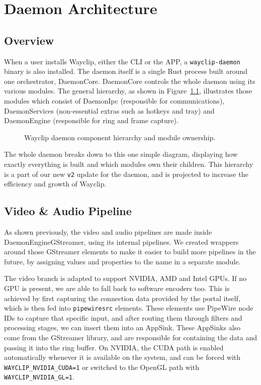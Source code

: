 \chapter{Daemon Architecture} \label{chapt:daemon}

\section{Overview}

When a user installs Wayclip, either the CLI or the APP, a \lstinline|wayclip-daemon| binary is also installed.
The daemon itself is a single Rust process built around one orchestrator, DaemonCore. DaemonCore controls the whole daemon using its various modules.
The general hierarchy, as shown in Figure~\ref{fig:ownership}, illustrates those modules which consist of DaemonIpc (responsible for communications), DaemonServices (non-essential extras such as hotkeys and tray) and DaemonEngine (responsible for ring and frame capture).

\begin{figure}[htbp]
	\centering
	
	\caption{Wayclip daemon component hierarchy and module ownership.}
	\label{fig:ownership}
\end{figure}

The whole daemon breaks down to this one simple diagram, displaying how exactly everything is built and which modules own their children. This hierarchy is a part of our new \lstinline|v2| update for the daemon, and is projected to increase the efficiency and growth of Wayclip.


\section{Video \& Audio Pipeline}

As shown previously, the video and audio pipelines are made inside DaemonEngineGStreamer, using its internal pipelines. We created wrappers around those GStreamer elements to make it easier to build more pipelines in the future, by assigning values and properties to the name in a separate module.

The video branch is adapted to support NVIDIA, AMD and Intel GPUs. If no GPU is present, we are able to fall back to software encoders too. This is achieved by first capturing the connection data provided by the portal itself, which is then fed into \lstinline|pipewiresrc| elements.
These elements use PipeWire node IDs to capture that specific input, and after routing them through filters and processing stages, we can insert them into an AppSink. These AppSinks also come from the GStreamer library, and are responsible for containing the data and passing it into the ring buffer. On NVIDIA, the CUDA path is enabled automatically whenever it is available on the system, and can be forced with \lstinline|WAYCLIP_NVIDIA_CUDA=1| or switched to the OpenGL path with \lstinline|WAYCLIP_NVIDIA_GL=1|.

